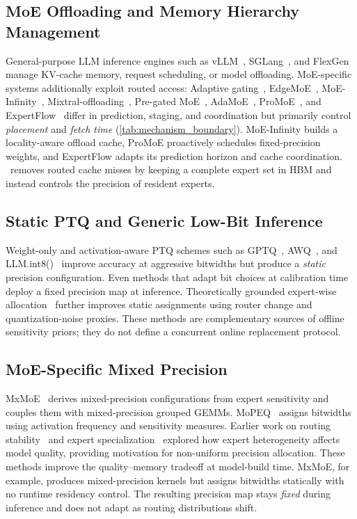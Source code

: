 \subsection{MoE Offloading and Memory Hierarchy Management}
General-purpose LLM inference engines such as vLLM~\cite{kwon2023vllm}, SGLang~\cite{zheng2024sglang}, and FlexGen~\cite{sheng2023flexgen} manage KV-cache memory, request scheduling, or model offloading. MoE-specific systems additionally exploit routed access: Adaptive gating~\cite{li2023adaptive}, EdgeMoE~\cite{yi2023edgemoe}, MoE-Infinity~\cite{xue2024moe}, Mixtral-offloading~\cite{eliseev2023fast}, Pre-gated MoE~\cite{hwang2024pre}, AdaMoE~\cite{zhong2024adapmoe}, ProMoE~\cite{song2024promoe}, and ExpertFlow~\cite{shen2025expertflow} differ in prediction, staging, and coordination but primarily control \emph{placement} and \emph{fetch time} (\autoref{tab:mechanism_boundary}). MoE-Infinity builds a locality-aware offload cache, ProMoE proactively schedules fixed-precision weights, and ExpertFlow adapts its prediction horizon and cache coordination. \systemname\ removes routed cache misses by keeping a complete expert set in HBM and instead controls the precision of resident experts.

\subsection{Static PTQ and Generic Low-Bit Inference}
Weight-only and activation-aware PTQ schemes such as GPTQ~\cite{frantar2022gptq}, AWQ~\cite{lin2024awq}, and LLM.int8()~\cite{dettmers2022gptint8} improve accuracy at aggressive bitwidths but produce a \emph{static} precision configuration. Even methods that adapt bit choices at calibration time deploy a fixed precision map at inference. Theoretically grounded expert-wise allocation~\cite{chowdhury2026efficient} further improves static assignments using router change and quantization-noise proxies. These methods are complementary sources of offline sensitivity priors; they do not define a concurrent online replacement protocol.

\subsection{MoE-Specific Mixed Precision}
MxMoE~\cite{duanmu2025mxmoe} derives mixed-precision configurations from expert sensitivity and couples them with mixed-precision grouped GEMMs. MoPEQ~\cite{chitty2025mopeq} assigns bitwidths using activation frequency and sensitivity measures. Earlier work on routing stability~\cite{fedus2022switch} and expert specialization~\cite{dai2024deepseekmoe} explored how expert heterogeneity affects model quality, providing motivation for non-uniform precision allocation. These methods improve the quality--memory tradeoff at model-build time. MxMoE, for example, produces mixed-precision kernels but assigns bitwidths statically with no runtime residency control. The resulting precision map stays \emph{fixed} during inference and does not adapt as routing distributions shift.

